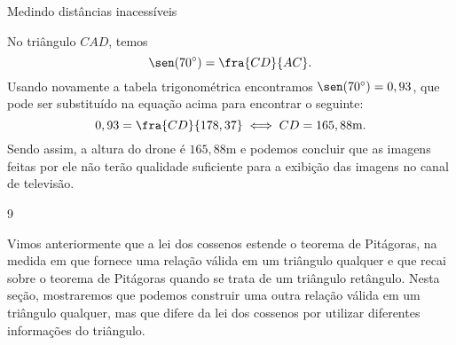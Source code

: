 \begin{answer}{Medindo distâncias inacessíveis}
{\begin{enumerate}
No triângulo $CAD$, temos
$$\sen(70^\circ)=\fra{CD}{AC}.$$
Usando novamente a tabela trigonométrica encontramos $\sen(70^\circ)=0,93$, que pode ser substituído na equação acima para encontrar o seguinte:
$$0,93=\fra{CD}{178,37} \iff CD=165,88\text{m}.$$
Sendo assim, a altura do drone é $165,88$m e podemos concluir que as imagens feitas por ele não terão qualidade suficiente para a exibição das imagens no canal de televisão.
\end{enumerate}
}{9}
\end{answer}

\label{exp_outrarelacaonotriangulo}
Vimos anteriormente que a lei dos cossenos estende o teorema de Pitágoras, na medida em que fornece uma relação válida em um triângulo qualquer e que recai sobre o teorema de Pitágoras quando se trata de um triângulo retângulo. Nesta seção, mostraremos que podemos construir uma outra relação válida em um triângulo qualquer, mas que difere da lei dos cossenos por utilizar diferentes informações do triângulo.

